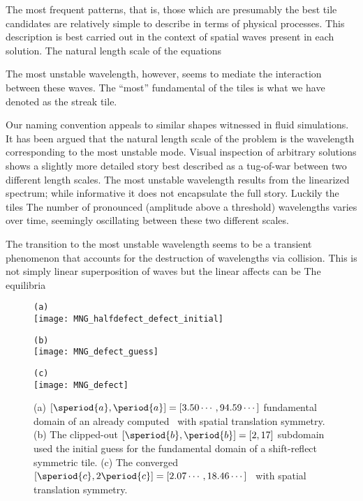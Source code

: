 \begin{description}
{The most frequent patterns, that is, those which are presumably the best tile
candidates are relatively simple to describe in terms of physical processes.
This description is best carried out in the context of spatial waves present
in each solution. The natural length scale of the equations

The most unstable wavelength, however, seems to mediate the interaction between these
waves.
The ``most'' fundamental of the tiles is what we have denoted as the streak tile.


Our
naming convention appeals to similar shapes witnessed in fluid simulations.
It has been argued that the natural length scale of the problem is the wavelength
corresponding to the most unstable mode. Visual inspection of arbitrary
solutions shows a slightly more detailed story best described as a tug-of-war between two
different length scales. The most unstable wavelength results from the linearized
spectrum; while informative it does not encapsulate the full story. Luckily the
tiles The number of pronounced (amplitude above a threshold)
wavelengths varies over time, seemingly oscillating between these two different scales.

The transition to the
most unstable wavelength seems to be a transient phenomenon that accounts for
the destruction of wavelengths via collision. This is not simply linear
superposition of waves but the linear affects can be
The equilibria

\begin{figure}
\begin{minipage}[height=.4\textheight]{.5\textwidth}
\centering \small{\texttt{(a)}}\\
\texttt{[image: MNG\_halfdefect\_defect\_initial]}
\end{minipage}
\begin{minipage}[height=.4\textheight]{.5\textwidth}
\centering \small{\texttt{(b)}}\\
\texttt{[image: MNG\_defect\_guess]}
\end{minipage}
\begin{minipage}[height=.1\textheight]{\textwidth}
\centering \small{\texttt{(c)}}\\
\texttt{[image: MNG\_defect]}
\end{minipage}
\caption{ \label{fig:defect}
(a)
$[\speriod{a},\period{a}]=[3.50\cdots,94.59\cdots]$ fundamental domain
of an already computed \twot\ with spatial translation symmetry.
(b)
The clipped-out $[\speriod{b},\period{b}]=[2,17]$ subdomain used the
initial guess for the fundamental domain of a shift-reflect symmetric tile.
(c)
The converged $[\speriod{c},2\period{c}]=[2.07\cdots,18.46\cdots]$ \twot\
with spatial translation symmetry.
}
\end{figure}

}
\end{description}
